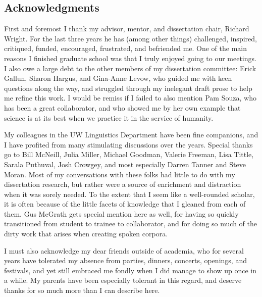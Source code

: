 \begin{spacing}{2}
\tableofcontents
\newpage

\listoffigures
\newpage

\listoftables
\newpage

\chapter*{Acknowledgments}
First and foremost I thank my advisor, mentor, and dissertation chair, Richard Wright.  For the last three years he has (among other things) challenged, inspired, critiqued, funded, encouraged, frustrated, and befriended me.  One of the main reasons I finished graduate school was that I truly enjoyed going to our meetings.  I also owe a large debt to the other members of my dissertation committee: Erick Gallun, Sharon Hargus, and Gina-Anne Levow, who guided me with keen questions along the way, and struggled through my inelegant draft prose to help me refine this work.  I would be remiss if I failed to also mention Pam Souza, who has been a great collaborator, and who showed me by her own example that science is at its best when we practice it in the service of humanity.  

My colleagues in the UW Linguistics Department have been fine companions, and I have profited from many stimulating discussions over the years.  Special thanks go to Bill McNeill, Julia Miller, Michael Goodman, Valerie Freeman, Lisa Tittle, Sarala Puthuval, Josh Crowgey, and most especially Darren Tanner and Steve Moran.  Most of my conversations with these folks had little to do with my dissertation research, but rather were a source of enrichment and distraction when it was sorely needed.  To the extent that I seem like a well-rounded scholar, it is often because of the little facets of knowledge that I gleaned from each of them.  Gus McGrath gets special mention here as well, for having so quickly transitioned from student to trainee to collaborator, and for doing so much of the dirty work that arises when creating spoken corpora.

I must also acknowledge my dear friends outside of academia, who for several years have tolerated my absence from parties, dinners, concerts, openings, and festivals, and yet still embraced me fondly when I did manage to show up once in a while.  My parents have been especially tolerant in this regard, and deserve thanks for so much more than I can describe here.


\end{spacing}
